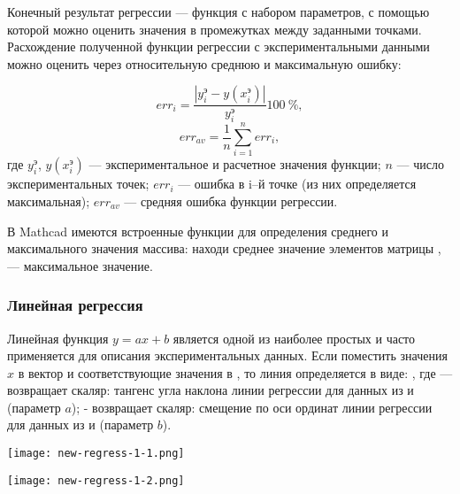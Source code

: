 Конечный результат регрессии --- функция с набором параметров, с помощью которой можно оценить значения в промежутках между заданными точками. Расхождение полученной функции регрессии с экспериментальными данными можно оценить через относительную среднюю и максимальную ошибку:

\begin{equation}
err_i= \dfrac{\left| y_i^э - y(x^э_i) \right|}{y_i^э} 100\ \% ,
\end{equation}
\begin{equation}
err_{av}=\dfrac{1}{n}\sum\limits_{i=1}^{n} err_i ,
\end{equation}
где $y_i^э$, $y(x_i^э)$ --- экспериментальное и расчетное значения функции; $n$ --- число экспериментальных точек; $err_i$ --- ошибка в i–й точке (из них определяется максимальная); $err_{av}$ --- средняя ошибка функции регрессии.

В Mathcad имеются встроенные функции для определения среднего и максимального значения массива:  находи среднее значение элементов матрицы ,  --- максимальное значение.

\subsubsection{Линейная регрессия}
Линейная функция $y=ax +b $ является одной из наиболее простых и часто применяется для описания экспериментальных данных. 
Если поместить значения $x$ в вектор  и соответствующие значения  в , то линия определяется в виде:
,
где  --- возвращает скаляр: тангенс угла наклона линии регрессии для данных из  и  (параметр $a$);
 - возвращает скаляр: смещение по оси ординат линии регрессии для данных из  и  (параметр $b$).


\begin{center}
	\texttt{[image: new-regress-1-1.png]}
\end{center}
\begin{center}
	\texttt{[image: new-regress-1-2.png]}
\end{center}

